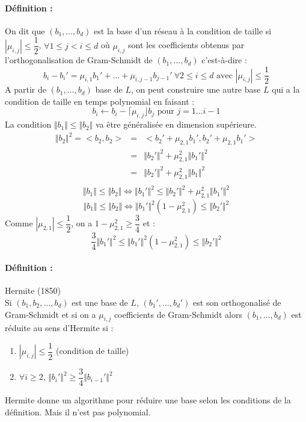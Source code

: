 \documentclass[12pt,a4paper]{report}
\begin{document}
\paragraph{Définition :\\}
On dit que $(b_1,\ldots,b_d)$ est la base d'un réseau à la condition de taille si $|\mu_{i,j}|\leqslant \dfrac{1}{2}$, $\forall 1 \leqslant j < i \leqslant d$ où $\mu_{i,j}$ sont les coefficients obtenus par l'orthogonalisation de Gram-Schmidt de $(b_1,\ldots,b_d)$ c'est-à-dire :
$$ b_i-b_i' = \mu_{i,1}b_1' + \ldots + \mu_{i,j-1}b_{j-1}' \ \forall 2 \leqslant i \leqslant d \mbox{ avec } | \mu_{i,j} | \leqslant \dfrac{1}{2} $$
A partir de $(b_1,\ldots,b_d)$ base de $L$, on peut construire une autre base $L$ qui a la condition de taille en temps polynomial en faisant :
$$ b_i \leftarrow b_i - \lceil \mu_{i,j} \rfloor b_j \mbox{ pour } j=1\ldots i-1$$
La condition $\Vert b_1 \Vert \leqslant \Vert b_2 \Vert$ va être généralisée en dimension supérieure.
\begin{eqnarray*}
\Vert b_2 \Vert ^2 =  <b_2,b_2> &=& <b_2'+\mu_{2,1}b_1',b_2'+\mu_{2,1}b_1'> \\
&=& \Vert b_2' \Vert ^2 + \mu_{2,1}^2 \Vert b_1' \Vert ^2 \\
&=& \Vert b_2' \Vert ^2 + \mu_{2,1}^2 \Vert b_1 \Vert ^2 \\
\end{eqnarray*}
$$ \Vert b_1 \Vert \leqslant \Vert b_2 \Vert \Leftrightarrow \Vert b_1' \Vert ^2 \leqslant \Vert b_2' \Vert ^2 + \mu_{2,1}^2 \Vert b_1' \Vert ^2 $$
$$  \Vert b_1 \Vert \leqslant \Vert b_2 \Vert \Leftrightarrow \Vert b_1' \Vert ^2(1-\mu_{2,1}^2) \leqslant \Vert b_2' \Vert ^2 $$
Comme $|\mu_{2,1}| \leqslant \dfrac{1}{2}$, on a $1-\mu_{2,1}^2 \geqslant \dfrac{3}{4} $ et :
$$ \frac{3}{4} \Vert b_1' \Vert ^2 \leqslant \Vert b_1' \Vert ^2 (1-\mu_{2,1}^2) \leqslant \Vert b_2' \Vert ^2 $$
\paragraph{Définition :} Hermite (1850)\\
Si $(b_1,b_2,\ldots,b_d)$ est une base de $L$, $(b_1',\ldots,b_d')$ est son orthogonalisé de Gram-Schmidt et si on a  $\mu_{i,j}$ coefficients de Gram-Schmidt alors $(b_1,\ldots,b_d)$ est réduite au sens d'Hermite si :
\begin{enumerate}
\item $|\mu_{i,j}| \leqslant \dfrac{1}{2} $ (condition de taille)
\item $\forall i \geqslant 2$, $\Vert b_i' \Vert ^2 \geqslant \dfrac{3}{4} \Vert b_{i-1}' \Vert ^2$
\end{enumerate}
Hermite donne un algorithme pour réduire une base selon les conditions de la définition. Mais il n'est pas polynomial.
\end{document}
